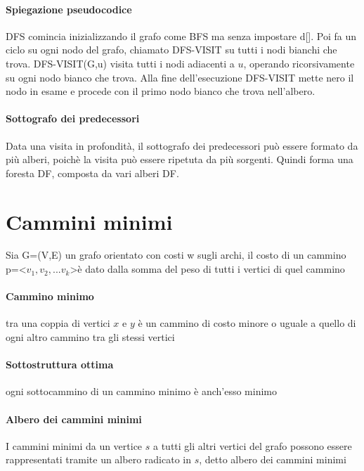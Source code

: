 \documentclass[12pt, a4paper, openany]{book}
\begin{document}
\paragraph{Spiegazione pseudocodice}
DFS comincia inizializzando il grafo come BFS ma senza impostare d[].
Poi fa un ciclo su ogni nodo del grafo, chiamato DFS-VISIT su tutti i nodi bianchi che trova.
DFS-VISIT(G,u) visita tutti i nodi adiacenti a $u$, operando ricorsivamente su ogni nodo bianco che trova.
Alla fine dell'esecuzione DFS-VISIT mette nero il nodo in esame e procede con il primo nodo bianco che trova nell'albero.


\paragraph{Sottografo dei predecessori}
Data una visita in profondità, il sottografo dei predecessori può essere formato da più alberi, poichè la visita può essere ripetuta da più sorgenti.
Quindi forma una foresta DF, composta da vari alberi DF.




\section{Cammini minimi}

Sia G=(V,E) un grafo orientato con costi w sugli archi,
il costo di un cammino p=\textless$ v_1,v_2,...v_k$\textgreater è dato
dalla somma del peso di tutti i vertici di quel cammino

\paragraph*{Cammino minimo}
tra una coppia di vertici $x$ e $y$ è un cammino di costo
minore o uguale a quello di ogni altro cammino tra gli stessi vertici

\paragraph*{Sottostruttura ottima}
ogni sottocammino di un cammino minimo è anch'esso minimo

\paragraph*{Albero dei cammini minimi}
I cammini minimi da un vertice $s$ a tutti gli altri vertici del grafo possono
essere rappresentati tramite un albero radicato in $s$, detto albero dei cammini minimi
\end{document}

